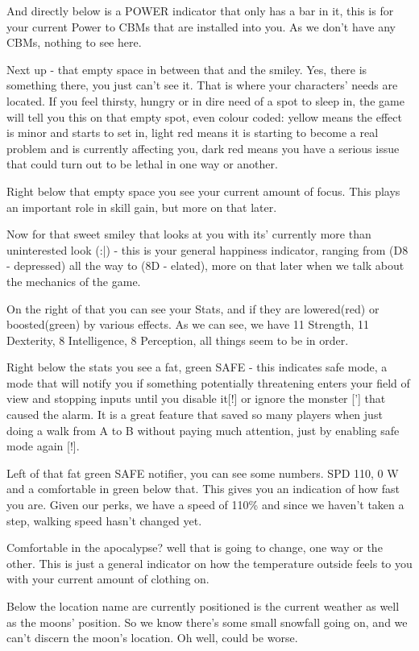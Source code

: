 \documentclass[11pt]{report}
\begin{document}
And directly below is a POWER indicator that only has a bar in it, this is for your current Power to CBMs that are installed into you. As we don't have any CBMs, nothing to see here.

Next up - that empty space in between that and the smiley. Yes, there is something there, you just can't see it. That is where your characters' needs are located. If you feel thirsty, hungry or in dire need of a spot to sleep in, the game will tell you this on that empty spot, even colour coded: yellow means the effect is minor and starts to set in, light red means it is starting to become a real problem and is currently affecting you, dark red means you have a serious issue that could turn out to be lethal in one way or another.

Right below that empty space you see your current amount of focus. This plays an important role in skill gain, but more on that later.

Now for that sweet smiley that looks at you with its' currently more than uninterested look (:|) - this is your general happiness indicator, ranging from (D8 - depressed) all the way to (8D - elated), more on that later when we talk about the mechanics of the game.

On the right of that you can see your Stats, and if they are lowered(red) or boosted(green) by various effects. As we can see, we have 11 Strength, 11 Dexterity, 8 Intelligence, 8 Perception, all things seem to be in order.

Right below the stats you see a fat, green SAFE - this indicates safe mode, a mode that will notify you if something potentially threatening enters your field of view and stopping inputs until you disable it[!] or ignore the monster ['] that caused the alarm. It is a great feature that saved so many players when just doing a walk from A to B without paying much attention, just by enabling safe mode again [!].

Left of that fat green SAFE notifier, you can see some numbers. SPD 110, 0 W and a comfortable in green below that. This gives you an indication of how fast you are. Given our perks, we have a speed of 110\% and since we haven't taken a step, walking speed hasn't changed yet.

Comfortable in the apocalypse? well that is going to change, one way or the other. This is just a general indicator on how the temperature outside feels to you with your current amount of clothing on.

Below the location name are currently positioned is the current weather as well as the moons' position. So we know there's some small snowfall going on, and we can't discern the moon's location. Oh well, could be worse.
\end{document}

